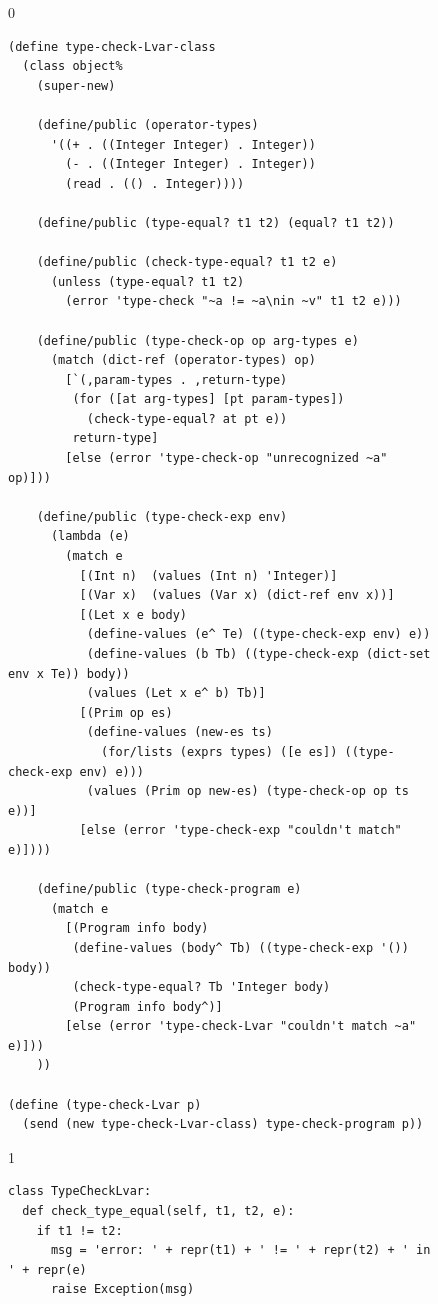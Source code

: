 \documentclass[7x10]{TimesAPriori_MIT}%
\def\racketEd{0}
\def\pythonEd{1}
\def\edition{0}
\numberwithin{theorem}{chapter}
\numberwithin{definition}{chapter}
\numberwithin{equation}{chapter}
\begin{document}
\begin{figure}[tbp]
\begin{tcolorbox}[colback=white]
{\if\edition\racketEd  
\begin{lstlisting}[basicstyle=\ttfamily\footnotesize]
(define type-check-Lvar-class
  (class object%
    (super-new)

    (define/public (operator-types)
      '((+ . ((Integer Integer) . Integer))
        (- . ((Integer Integer) . Integer))
        (read . (() . Integer))))

    (define/public (type-equal? t1 t2) (equal? t1 t2))

    (define/public (check-type-equal? t1 t2 e)
      (unless (type-equal? t1 t2)
        (error 'type-check "~a != ~a\nin ~v" t1 t2 e)))

    (define/public (type-check-op op arg-types e)
      (match (dict-ref (operator-types) op)
        [`(,param-types . ,return-type)
         (for ([at arg-types] [pt param-types])
           (check-type-equal? at pt e))
         return-type]
        [else (error 'type-check-op "unrecognized ~a" op)]))

    (define/public (type-check-exp env)
      (lambda (e)
        (match e
          [(Int n)  (values (Int n) 'Integer)]
          [(Var x)  (values (Var x) (dict-ref env x))]
          [(Let x e body)
           (define-values (e^ Te) ((type-check-exp env) e))
           (define-values (b Tb) ((type-check-exp (dict-set env x Te)) body))
           (values (Let x e^ b) Tb)]
          [(Prim op es)
           (define-values (new-es ts)
             (for/lists (exprs types) ([e es]) ((type-check-exp env) e)))
           (values (Prim op new-es) (type-check-op op ts e))]
          [else (error 'type-check-exp "couldn't match" e)])))

    (define/public (type-check-program e)
      (match e
        [(Program info body)
         (define-values (body^ Tb) ((type-check-exp '()) body))
         (check-type-equal? Tb 'Integer body)
         (Program info body^)]
        [else (error 'type-check-Lvar "couldn't match ~a" e)]))
    ))

(define (type-check-Lvar p)
  (send (new type-check-Lvar-class) type-check-program p))
\end{lstlisting}
\fi}
{\if\edition\pythonEd
\begin{lstlisting}[escapechar=`]
class TypeCheckLvar:
  def check_type_equal(self, t1, t2, e):
    if t1 != t2:
      msg = 'error: ' + repr(t1) + ' != ' + repr(t2) + ' in ' + repr(e)
      raise Exception(msg)
          

\end{lstlisting}}
\end{tcolorbox}
\end{figure}
\end{document}

